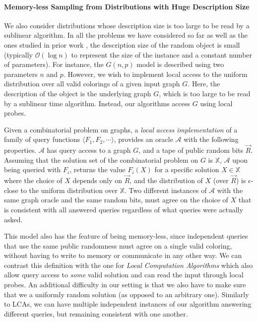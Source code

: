 \paragraph*{Memory-less Sampling from Distributions with Huge Description Size}
\label{par:memory_less_sampling_from_distributions_with_huge_description_size}
We also consider distributions whose description size is too large to be read by a sublinear algorithm.
In all the problems we have considered so far as well as the ones studied in prior work \cite{huge,sparse,reut}, the description size
of the random object is small (typically $\mathcal O(\log n)$ to represent the size of the instance and a constant number of parameters).
For instance, the $G(n, p)$ model is described using two parameters $n$ and $p$.
However, we wish to implement local access to the uniform distribution over all valid colorings of a given input graph $G$.
Here, the description of the object is the underlying graph $G$, which is too large to be read by a sublinear time algorithm.
Instead, our algorithms access $G$ using local probes.
\begin{definition}
\label{def:local_access_LCA}
Given a combinatorial problem on graphs,
a \emph{local access implementation} of a family of query functions $\langle F_1, F_2,\cdots \rangle$,
provides an oracle $\mathcal A$ with the following properties.
$\mathcal A$ has query access to a graph $G$, and a tape of public random bits $\vec R$.
Assuming that the solution set of the combinatorial problem on $G$ is $\mathbb X$,
$\mathcal A$ upon being queried with $F_i$, returns the value $F_i(X)$ for a specific solution $X\in\mathbb X$ where the choice of $X$
depends only on $\vec R$, and the distribution of $X$ (over $\vec R$) is $\epsilon$-close to the uniform distribution over $\mathbb X$.
Two different instances of $\mathcal A$ with the same graph oracle and the same random bits,
must agree on the choice of $X$ that is consistent with all answered queries regardless of what queries were actually asked.
\end{definition}

This model also has the feature of being memory-less, since independent queries that use the same public randomness
must agree on a single valid coloring, without having to write to memory or communicate in any other way.
We can contrast this definition with the one for \emph{Local Computation Algorithms} \cite{LCA, LCA_space_efficient}
which also allow query access to \emph{some} valid solution and can read the input through local probes.
An additional difficulty in our setting is that we also have to make sure that we a uniformly random solution (as opposed to an arbitrary one).
Similarly to LCAs, we can have multiple independent instances of our algorithm answering different queries, but remaining consistent with one another.



